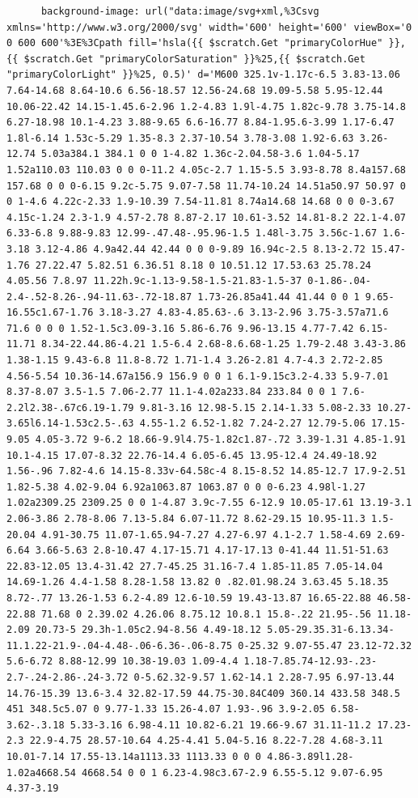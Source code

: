 \documentclass[11pt]{article}
\begin{document}
\begin{enumerate}
\begin{verbatim}
      background-image: url("data:image/svg+xml,%3Csvg xmlns='http://www.w3.org/2000/svg' width='600' height='600' viewBox='0 0 600 600'%3E%3Cpath fill='hsla({{ $scratch.Get "primaryColorHue" }},{{ $scratch.Get "primaryColorSaturation" }}%25,{{ $scratch.Get "primaryColorLight" }}%25, 0.5)' d='M600 325.1v-1.17c-6.5 3.83-13.06 7.64-14.68 8.64-10.6 6.56-18.57 12.56-24.68 19.09-5.58 5.95-12.44 10.06-22.42 14.15-1.45.6-2.96 1.2-4.83 1.9l-4.75 1.82c-9.78 3.75-14.8 6.27-18.98 10.1-4.23 3.88-9.65 6.6-16.77 8.84-1.95.6-3.99 1.17-6.47 1.8l-6.14 1.53c-5.29 1.35-8.3 2.37-10.54 3.78-3.08 1.92-6.63 3.26-12.74 5.03a384.1 384.1 0 0 1-4.82 1.36c-2.04.58-3.6 1.04-5.17 1.52a110.03 110.03 0 0 0-11.2 4.05c-2.7 1.15-5.5 3.93-8.78 8.4a157.68 157.68 0 0 0-6.15 9.2c-5.75 9.07-7.58 11.74-10.24 14.51a50.97 50.97 0 0 1-4.6 4.22c-2.33 1.9-10.39 7.54-11.81 8.74a14.68 14.68 0 0 0-3.67 4.15c-1.24 2.3-1.9 4.57-2.78 8.87-2.17 10.61-3.52 14.81-8.2 22.1-4.07 6.33-6.8 9.88-9.83 12.99-.47.48-.95.96-1.5 1.48l-3.75 3.56c-1.67 1.6-3.18 3.12-4.86 4.9a42.44 42.44 0 0 0-9.89 16.94c-2.5 8.13-2.72 15.47-1.76 27.22.47 5.82.51 6.36.51 8.18 0 10.51.12 17.53.63 25.78.24 4.05.56 7.8.97 11.22h.9c-1.13-9.58-1.5-21.83-1.5-37 0-1.86-.04-2.4-.52-8.26-.94-11.63-.72-18.87 1.73-26.85a41.44 41.44 0 0 1 9.65-16.55c1.67-1.76 3.18-3.27 4.83-4.85.63-.6 3.13-2.96 3.75-3.57a71.6 71.6 0 0 0 1.52-1.5c3.09-3.16 5.86-6.76 9.96-13.15 4.77-7.42 6.15-11.71 8.34-22.44.86-4.21 1.5-6.4 2.68-8.6.68-1.25 1.79-2.48 3.43-3.86 1.38-1.15 9.43-6.8 11.8-8.72 1.71-1.4 3.26-2.81 4.7-4.3 2.72-2.85 4.56-5.54 10.36-14.67a156.9 156.9 0 0 1 6.1-9.15c3.2-4.33 5.9-7.01 8.37-8.07 3.5-1.5 7.06-2.77 11.1-4.02a233.84 233.84 0 0 1 7.6-2.2l2.38-.67c6.19-1.79 9.81-3.16 12.98-5.15 2.14-1.33 5.08-2.33 10.27-3.65l6.14-1.53c2.5-.63 4.55-1.2 6.52-1.82 7.24-2.27 12.79-5.06 17.15-9.05 4.05-3.72 9-6.2 18.66-9.9l4.75-1.82c1.87-.72 3.39-1.31 4.85-1.91 10.1-4.15 17.07-8.32 22.76-14.4 6.05-6.45 13.95-12.4 24.49-18.92 1.56-.96 7.82-4.6 14.15-8.33v-64.58c-4 8.15-8.52 14.85-12.7 17.9-2.51 1.82-5.38 4.02-9.04 6.92a1063.87 1063.87 0 0 0-6.23 4.98l-1.27 1.02a2309.25 2309.25 0 0 1-4.87 3.9c-7.55 6-12.9 10.05-17.61 13.19-3.1 2.06-3.86 2.78-8.06 7.13-5.84 6.07-11.72 8.62-29.15 10.95-11.3 1.5-20.04 4.91-30.75 11.07-1.65.94-7.27 4.27-6.97 4.1-2.7 1.58-4.69 2.69-6.64 3.66-5.63 2.8-10.47 4.17-15.71 4.17-17.13 0-41.44 11.51-51.63 22.83-12.05 13.4-31.42 27.7-45.25 31.16-7.4 1.85-11.85 7.05-14.04 14.69-1.26 4.4-1.58 8.28-1.58 13.82 0 .82.01.98.24 3.63.45 5.18.35 8.72-.77 13.26-1.53 6.2-4.89 12.6-10.59 19.43-13.87 16.65-22.88 46.58-22.88 71.68 0 2.39.02 4.26.06 8.75.12 10.8.1 15.8-.22 21.95-.56 11.18-2.09 20.73-5 29.3h-1.05c2.94-8.56 4.49-18.12 5.05-29.35.31-6.13.34-11.1.22-21.9-.04-4.48-.06-6.36-.06-8.75 0-25.32 9.07-55.47 23.12-72.32 5.6-6.72 8.88-12.99 10.38-19.03 1.09-4.4 1.18-7.85.74-12.93-.23-2.7-.24-2.86-.24-3.72 0-5.62.32-9.57 1.62-14.1 2.28-7.95 6.97-13.44 14.76-15.39 13.6-3.4 32.82-17.59 44.75-30.84C409 360.14 433.58 348.5 451 348.5c5.07 0 9.77-1.33 15.26-4.07 1.93-.96 3.9-2.05 6.58-3.62-.3.18 5.33-3.16 6.98-4.11 10.82-6.21 19.66-9.67 31.11-11.2 17.23-2.3 22.9-4.75 28.57-10.64 4.25-4.41 5.04-5.16 8.22-7.28 4.68-3.11 10.01-7.14 17.55-13.14a1113.33 1113.33 0 0 0 4.86-3.89l1.28-1.02a4668.54 4668.54 0 0 1 6.23-4.98c3.67-2.9 6.55-5.12 9.07-6.95 4.37-3.19 
\end{verbatim}
\end{enumerate}
\end{document}
